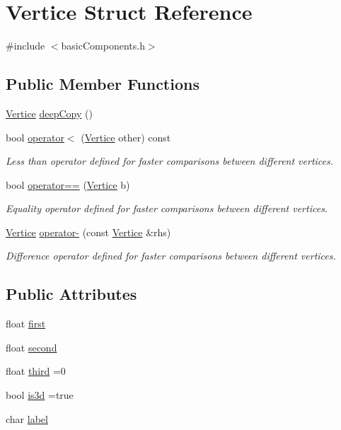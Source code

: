\hypertarget{structVertice}{}\section{Vertice Struct Reference}
\label{structVertice}


{\ttfamily \#include $<$basic\+Components.\+h$>$}

\subsection*{Public Member Functions}
\begin{DoxyCompactItemize}
\item 
\hyperlink{structVertice}{Vertice} \hyperlink{structVertice_a914a6647d86f9f439c1b8751674973ec}{deep\+Copy} ()
\item 
bool \hyperlink{structVertice_a8ed5964130f1d72b0a9ab0ce72506e1d}{operator$<$} (\hyperlink{structVertice}{Vertice} other) const
\begin{DoxyCompactList}\small\item\em Less than operator defined for faster comparisons between different vertices. \end{DoxyCompactList}\item 
bool \hyperlink{structVertice_a17d6154f69e230b4c927fe70e8442f4c}{operator==} (\hyperlink{structVertice}{Vertice} b)
\begin{DoxyCompactList}\small\item\em Equality operator defined for faster comparisons between different vertices. \end{DoxyCompactList}\item 
\hyperlink{structVertice}{Vertice} \hyperlink{structVertice_a2f9bd3f865f0613f41bbc2dd3ac2d08d}{operator-\/} (const \hyperlink{structVertice}{Vertice} \&rhs)
\begin{DoxyCompactList}\small\item\em Difference operator defined for faster comparisons between different vertices. \end{DoxyCompactList}\end{DoxyCompactItemize}
\subsection*{Public Attributes}
\begin{DoxyCompactItemize}
\item 
float \hyperlink{structVertice_a458c4138041414f66cc8234dcb8a76a8}{first}
\item 
float \hyperlink{structVertice_a3b09ccd0c9d23978cb17ebe303b498a2}{second}
\item 
float \hyperlink{structVertice_a781306a1aba368740f76928fc4b3b6bc}{third} =0
\item 
bool \hyperlink{structVertice_ae1b4f2a0c6783f5cf06b6dbcc49f8231}{is3d} =true
\item 
char \hyperlink{structVertice_a0181015506ba076b22502bba2c02f4cf}{label}
\end{DoxyCompactItemize}


